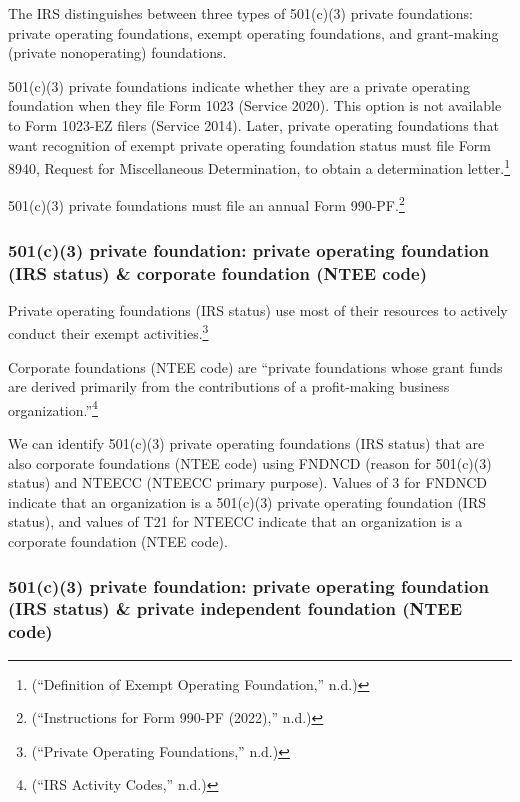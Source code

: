 \documentclass[
  letterpaper,
  DIV=11,
  numbers=noendperiod]{scrreprt}
\begin{document}
The IRS distinguishes between three types of 501(c)(3) private
foundations: private operating foundations, exempt operating
foundations, and grant-making (private nonoperating) foundations.

501(c)(3) private foundations indicate whether they are a private
operating foundation when they file Form 1023 (Service 2020). This
option is not available to Form 1023-EZ filers (Service 2014). Later,
private operating foundations that want recognition of exempt private
operating foundation status must file Form 8940, Request for
Miscellaneous Determination, to obtain a determination
letter.\footnote{({``Definition of Exempt Operating Foundation,''} n.d.)}

501(c)(3) private foundations must file an annual Form
990-PF.\footnote{({``Instructions for Form 990-PF (2022),''} n.d.)}

\hypertarget{c3-private-foundation-private-operating-foundation-irs-status-corporate-foundation-ntee-code}{%
\subsubsection{501(c)(3) private foundation: private operating
foundation (IRS status) \& corporate foundation (NTEE
code)}\label{c3-private-foundation-private-operating-foundation-irs-status-corporate-foundation-ntee-code}}

Private operating foundations (IRS status) use most of their resources
to actively conduct their exempt activities.\footnote{({``Private
  Operating Foundations,''} n.d.)}

Corporate foundations (NTEE code) are ``private foundations whose grant
funds are derived primarily from the contributions of a profit-making
business organization.''\footnote{({``IRS Activity Codes,''} n.d.)}

We can identify 501(c)(3) private operating foundations (IRS status)
that are also corporate foundations (NTEE code) using FNDNCD (reason for
501(c)(3) status) and NTEECC (NTEECC primary purpose). Values of 3 for
FNDNCD indicate that an organization is a 501(c)(3) private operating
foundation (IRS status), and values of T21 for NTEECC indicate that an
organization is a corporate foundation (NTEE code).

\hypertarget{c3-private-foundation-private-operating-foundation-irs-status-private-independent-foundation-ntee-code}{%
\subsubsection{501(c)(3) private foundation: private operating
foundation (IRS status) \& private independent foundation (NTEE
code)}\label{c3-private-foundation-private-operating-foundation-irs-status-private-independent-foundation-ntee-code}}
\end{document}
